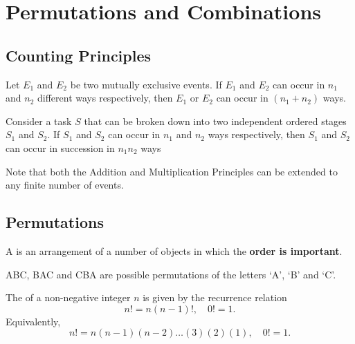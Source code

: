 \chapter{Permutations and Combinations}\label{chap:Permutations-and-Combinations}

\section{Counting Principles}

\begin{fact}
    Let $E_1$ and $E_2$ be two mutually exclusive events. If $E_1$ and $E_2$ can occur in $n_1$ and $n_2$ different ways respectively, then $E_1$ or $E_2$ can occur in $(n_1 + n_2)$ ways.
\end{fact}

\begin{fact}
    Consider a task $S$ that can be broken down into two independent ordered stages $S_1$ and $S_2$. If $S_1$ and $S_2$ can occur in $n_1$ and $n_2$ ways respectively, then $S_1$ and $S_2$ can occur in succession in $n_1 n_2$ ways
\end{fact}

Note that both the Addition and Multiplication Principles can be extended to any finite number of events.

\section{Permutations}

\begin{definition}
    A  is an arrangement of a number of objects in which the \textbf{order is important}.
\end{definition}

\begin{example}
    ABC, BAC and CBA are possible permutations of the letters `A', `B' and `C'.
\end{example}

\begin{definition}[Factorial]
    The  of a non-negative integer $n$ is given by the recurrence relation \[n! = n(n-1)!, \quad 0! = 1.\] Equivalently, \[n! = n(n-1)(n-2)\dots(3)(2)(1), \quad 0! = 1.\]
\end{definition}

